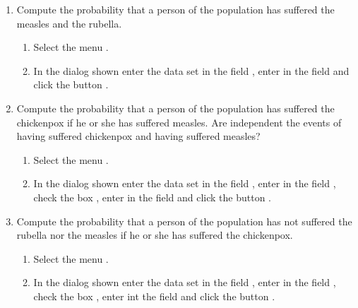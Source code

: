 \begin{enumerate}[leftmargin=*]
\begin{enumerate}
\item Compute the probability that a person of the population has suffered the measles and the rubella. 
\begin{indication}
\begin{enumerate}
\item Select the menu .
\item In the dialog shown enter the data set  in the field , enter
 in the field  and click the button .
\end{enumerate}
\end{indication} 

\item Compute the probability that a person of the population has suffered the chickenpox if he or she has suffered measles.
Are independent the events of having suffered chickenpox and having suffered measles?
\begin{indication}
\begin{enumerate}
\item Select the menu .
\item In the dialog shown enter the data set  in the field , enter
 in the field , check the box , enter  in the field  and click the button .
\end{enumerate}
\end{indication} 

\item Compute the probability that a person of the population has not suffered the rubella nor the measles if he or she has suffered the chickenpox. 
\begin{indication}
\begin{enumerate}
\item Select the menu .
\item In the dialog shown enter the data set  in the field , enter
 in the field , check the box , enter  int the field  and click the button .
\end{enumerate}
\end{indication} 
\end{enumerate}



\end{enumerate}
